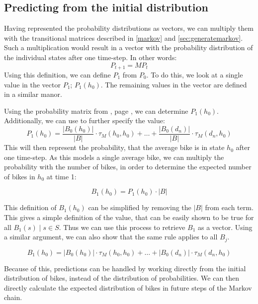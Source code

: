 \subsection{Predicting from the initial distribution}
Having represented the probability distributions as vectors, we can multiply them with the transitional matrices described in \cref{markov} and \cref{sec:generatemarkov}.
Such a multiplication would result in a vector with the probability distribution of the individual states after one time-step.
In other words:
\begin{equation}
P_{t+1} = M  P_t
\end{equation}
Using this definition, we can define $P_1$ from $P_0$.
To do this, we look at a single value in the vector $P_1$; $P_1(h_0)$.
The remaining values in the vector are defined in a similar manor.

Using the probability matrix from , page \pageref{markov:matrix-ordered}, we can determine $P_1(h_0)$.
Additionally, we can use  to further specify the value:
$$
P_1(h_0) = 
\frac{\lvert B_0(h_0) \rvert}{\lvert B \rvert}
\cdot \tau_M(h_0, h_0) + \dots +
\frac{\lvert B_0(d_n) \rvert}{\lvert B \rvert}
\cdot \tau_M(d_n, h_0)
$$
This will then represent the probability, that the average bike is in state $h_0$ after one time-step.
As this models a single average bike, we can multiply the probability with the number of bikes, in order to determine the expected number of bikes in $h_0$ at time 1:

$$B_1(h_0) = P_1(h_0) \cdot |B|$$

This definition of $B_1(h_0)$ can be simplified by removing the $|B|$ from each term.
This gives a simple definition of the value, that can be easily shown to be true for all $B_1(s) \mid s \in S$.
Thus we can use this process to retrieve $B_1$ as a vector.
Using a similar argument, we can also show that the same rule applies to all $B_j$.

$$
B_1(h_0) = 
\lvert B_0(h_0) \rvert
\cdot \tau_M(h_0, h_0) + \dots +
\lvert B_0(d_n) \rvert
\cdot \tau_M(d_n, h_0)
$$

Because of this, predictions can be handled by working directly from the initial distribution of bikes, instead of the distribution of probabilities.
We can then directly calculate the expected distribution of bikes in future steps of the Markov chain.

